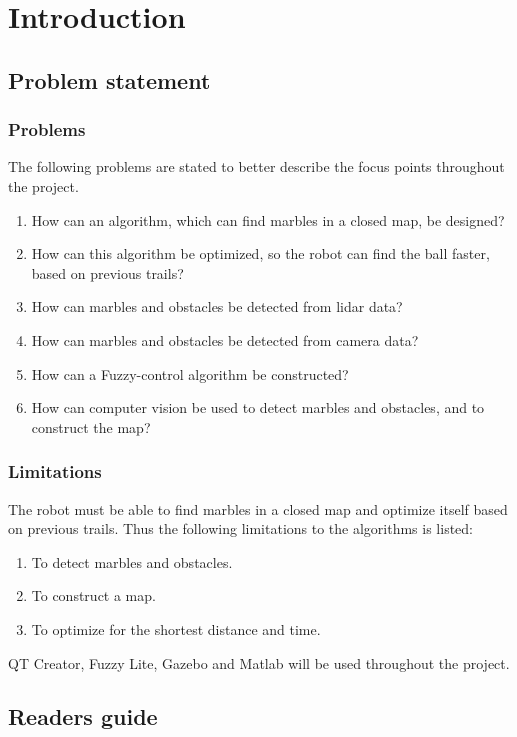 \documentclass[../Head/Main.tex]{subfiles}
\begin{document}
\section{Introduction}


\subsection{Problem statement}
\subsubsection{Problems}
The following problems are stated to better describe the focus points throughout the project.
\begin{enumerate}
        \item How can an algorithm, which can find marbles in a closed map, be designed?
        \item How can this algorithm be optimized, so the robot can find the ball faster, based on previous trails? 
        \item How can marbles and obstacles be detected from lidar data?
        \item How can marbles and obstacles be detected from camera data?
        \item How can a Fuzzy-control algorithm be constructed?
        \item How can computer vision be used to detect marbles and obstacles, and to construct the map? 
\end{enumerate}
\subsubsection{Limitations}
The robot must be able to find marbles in a closed map and optimize itself based on previous trails. Thus the following limitations to the algorithms is listed: 
\begin{enumerate}
    \item To detect marbles and obstacles.
    \item To construct a map.
    \item To optimize for the shortest distance and time.
\end{enumerate}
QT Creator, Fuzzy Lite, Gazebo and Matlab will be used throughout the project.

\subsection{Readers guide}
\end{document}
